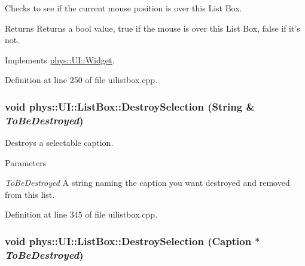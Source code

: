 Checks to see if the current mouse position is over this List Box. 

\begin{DoxyReturn}{Returns}
Returns a bool value, true if the mouse is over this List Box, false if it's not. 
\end{DoxyReturn}


Implements \hyperlink{classphys_1_1UI_1_1Widget_a613df6dbb42efe139d185043a00259dc}{phys::UI::Widget}.



Definition at line 250 of file uilistbox.cpp.

\hypertarget{classphys_1_1UI_1_1ListBox_a3aa3bfaee473b7590692e8707dada68d}{
\subsubsection[{DestroySelection}]{\setlength{\rightskip}{0pt plus 5cm}void phys::UI::ListBox::DestroySelection ({\bf String} \& {\em ToBeDestroyed})}}
\label{d0/d28/classphys_1_1UI_1_1ListBox_a3aa3bfaee473b7590692e8707dada68d}


Destroys a selectable caption. 


\begin{DoxyParams}{Parameters}
\item[{\em ToBeDestroyed}]A string naming the caption you want destroyed and removed from this list. \end{DoxyParams}


Definition at line 345 of file uilistbox.cpp.

\hypertarget{classphys_1_1UI_1_1ListBox_a295acf830ed17c78a59e5ba871a5a234}{
\subsubsection[{DestroySelection}]{\setlength{\rightskip}{0pt plus 5cm}void phys::UI::ListBox::DestroySelection ({\bf Caption} $\ast$ {\em ToBeDestroyed})}}
\label{d0/d28/classphys_1_1UI_1_1ListBox_a295acf830ed17c78a59e5ba871a5a234}


